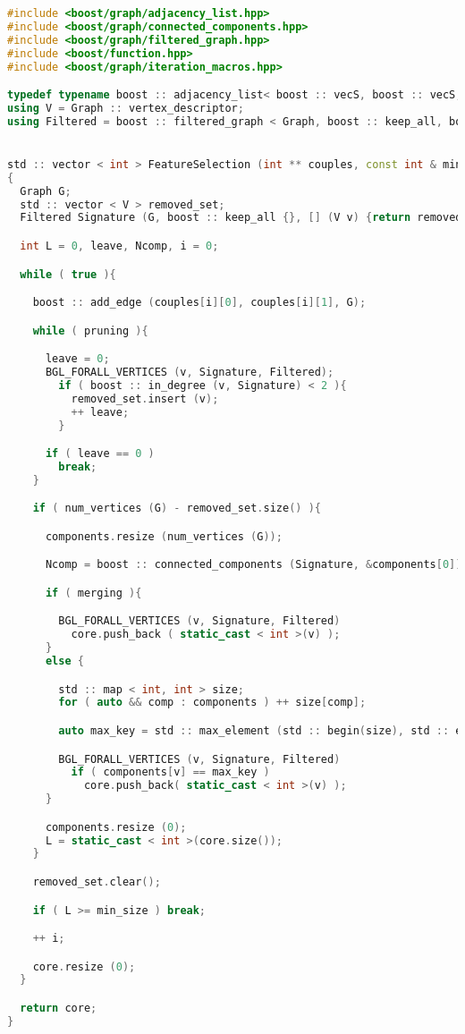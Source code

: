 \documentclass{standalone}
\begin{document}
\lstset{style=c++}
\begin{lstlisting}[language=C++, caption=DNetPRO signature extraction, label=code:featuresel]
#include <boost/graph/adjacency_list.hpp>
#include <boost/graph/connected_components.hpp>
#include <boost/graph/filtered_graph.hpp>
#include <boost/function.hpp>
#include <boost/graph/iteration_macros.hpp>

typedef typename boost :: adjacency_list< boost :: vecS, boost :: vecS, boost :: undirectedS, boost :: property< boost :: vertex_color_t, int >, boost :: property < boost :: edge_index_t, int > > Graph;
using V = Graph :: vertex_descriptor;
using Filtered = boost :: filtered_graph < Graph, boost :: keep_all, boost :: function < bool(V) > >;


std :: vector < int > FeatureSelection (int ** couples, const int & min_size, bool pruning=true,  bool merging=true)
{
  Graph G;
  std :: vector < V > removed_set;
  Filtered Signature (G, boost :: keep_all {}, [] (V v) {return removed_set.end() == removed_set.find(v);});

  int L = 0, leave, Ncomp, i = 0;

  while ( true ){

    boost :: add_edge (couples[i][0], couples[i][1], G);

    while ( pruning ){

      leave = 0;
      BGL_FORALL_VERTICES (v, Signature, Filtered);
        if ( boost :: in_degree (v, Signature) < 2 ){
          removed_set.insert (v);
          ++ leave;
        }

      if ( leave == 0 )
        break;
    }

    if ( num_vertices (G) - removed_set.size() ){

      components.resize (num_vertices (G));

      Ncomp = boost :: connected_components (Signature, &components[0]);

      if ( merging ){

        BGL_FORALL_VERTICES (v, Signature, Filtered)
          core.push_back ( static_cast < int >(v) );
      }
      else {

        std :: map < int, int > size;
        for ( auto && comp : components ) ++ size[comp];

        auto max_key = std :: max_element (std :: begin(size), std :: end(size), [] (auto && p1, auto && p2) { return p1.second < p2.second; })->first;

        BGL_FORALL_VERTICES (v, Signature, Filtered)
          if ( components[v] == max_key )
            core.push_back( static_cast < int >(v) );
      }

      components.resize (0);
      L = static_cast < int >(core.size());
    }

    removed_set.clear();

    if ( L >= min_size ) break;

    ++ i;

    core.resize (0);
  }

  return core;
}

\end{lstlisting}
\end{document}
